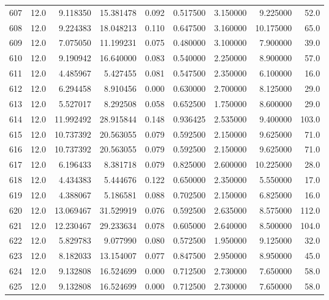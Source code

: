 \begin{tabular}{lrrrrrrrr}
607  &   12.0 &   9.118350 &  15.381478 &  0.092 &  0.517500 &  3.150000 &   9.225000 &   52.0 \\
608  &   12.0 &   9.224383 &  18.048213 &  0.110 &  0.647500 &  3.160000 &  10.175000 &   65.0 \\
609  &   12.0 &   7.075050 &  11.199231 &  0.075 &  0.480000 &  3.100000 &   7.900000 &   39.0 \\
610  &   12.0 &   9.190942 &  16.640000 &  0.083 &  0.540000 &  2.250000 &   8.900000 &   57.0 \\
611  &   12.0 &   4.485967 &   5.427455 &  0.081 &  0.547500 &  2.350000 &   6.100000 &   16.0 \\
612  &   12.0 &   6.294458 &   8.910456 &  0.000 &  0.630000 &  2.700000 &   8.125000 &   29.0 \\
613  &   12.0 &   5.527017 &   8.292508 &  0.058 &  0.652500 &  1.750000 &   8.600000 &   29.0 \\
614  &   12.0 &  11.992492 &  28.915844 &  0.148 &  0.936425 &  2.535000 &   9.400000 &  103.0 \\
615  &   12.0 &  10.737392 &  20.563055 &  0.079 &  0.592500 &  2.150000 &   9.625000 &   71.0 \\
616  &   12.0 &  10.737392 &  20.563055 &  0.079 &  0.592500 &  2.150000 &   9.625000 &   71.0 \\
617  &   12.0 &   6.196433 &   8.381718 &  0.079 &  0.825000 &  2.600000 &  10.225000 &   28.0 \\
618  &   12.0 &   4.434383 &   5.444676 &  0.122 &  0.650000 &  2.350000 &   5.550000 &   17.0 \\
619  &   12.0 &   4.388067 &   5.186581 &  0.088 &  0.702500 &  2.150000 &   6.825000 &   16.0 \\
620  &   12.0 &  13.069467 &  31.529919 &  0.076 &  0.592500 &  2.635000 &   8.575000 &  112.0 \\
621  &   12.0 &  12.230467 &  29.233634 &  0.078 &  0.605000 &  2.640000 &   8.500000 &  104.0 \\
622  &   12.0 &   5.829783 &   9.077990 &  0.080 &  0.572500 &  1.950000 &   9.125000 &   32.0 \\
623  &   12.0 &   8.182033 &  13.154007 &  0.077 &  0.847500 &  2.950000 &   8.950000 &   45.0 \\
624  &   12.0 &   9.132808 &  16.524699 &  0.000 &  0.712500 &  2.730000 &   7.650000 &   58.0 \\
625  &   12.0 &   9.132808 &  16.524699 &  0.000 &  0.712500 &  2.730000 &   7.650000 &   58.0 \\

\end{tabular}
